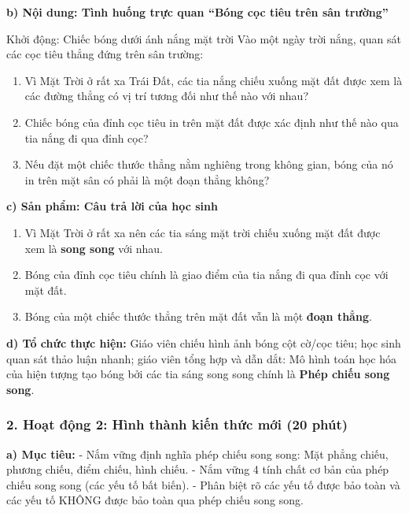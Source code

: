 \documentclass[12pt, a4paper]{article}
\begin{document}
\noindent \textbf{b) Nội dung: Tình huống trực quan ``Bóng cọc tiêu trên sân trường''}
\begin{pedabox}{Khởi động: Chiếc bóng dưới ánh nắng mặt trời}
Vào một ngày trời nắng, quan sát các cọc tiêu thẳng đứng trên sân trường:
\begin{enumerate}[leftmargin=0.6cm]
    \item Vì Mặt Trời ở rất xa Trái Đất, các tia nắng chiếu xuống mặt đất được xem là các đường thẳng có vị trí tương đối như thế nào với nhau?
    \item Chiếc bóng của đỉnh cọc tiêu in trên mặt đất được xác định như thế nào qua tia nắng đi qua đỉnh cọc?
    \item Nếu đặt một chiếc thước thẳng nằm nghiêng trong không gian, bóng của nó in trên mặt sân có phải là một đoạn thẳng không?
\end{enumerate}
\end{pedabox}

\noindent \textbf{c) Sản phẩm: Câu trả lời của học sinh}
\begin{enumerate}[leftmargin=0.6cm]
    \item Vì Mặt Trời ở rất xa nên các tia sáng mặt trời chiếu xuống mặt đất được xem là \textbf{song song} với nhau.
    \item Bóng của đỉnh cọc tiêu chính là giao điểm của tia nắng đi qua đỉnh cọc với mặt đất.
    \item Bóng của một chiếc thước thẳng trên mặt đất vẫn là một \textbf{đoạn thẳng}.
\end{enumerate}

\noindent \textbf{d) Tổ chức thực hiện:}
Giáo viên chiếu hình ảnh bóng cột cờ/cọc tiêu; học sinh quan sát thảo luận nhanh; giáo viên tổng hợp và dẫn dắt: Mô hình toán học hóa của hiện tượng tạo bóng bởi các tia sáng song song chính là \textbf{Phép chiếu song song}.

\subsubsection*{2. Hoạt động 2: Hình thành kiến thức mới (20 phút)}

\noindent \textbf{a) Mục tiêu:}
- Nắm vững định nghĩa phép chiếu song song: Mặt phẳng chiếu, phương chiếu, điểm chiếu, hình chiếu.
- Nắm vững 4 tính chất cơ bản của phép chiếu song song (các yếu tố bất biến).
- Phân biệt rõ các yếu tố được bảo toàn và các yếu tố KHÔNG được bảo toàn qua phép chiếu song song.
\end{document}
